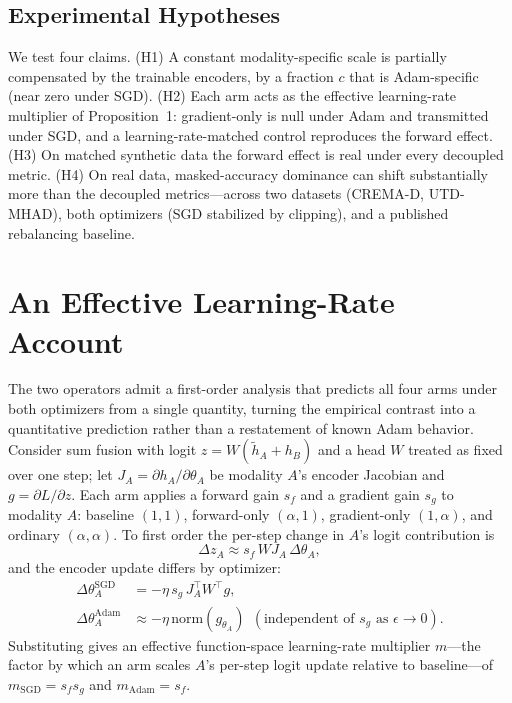 \documentclass[conference]{IEEEtran}
\begin{document}
\subsection{Experimental Hypotheses}
We test four claims. (H1) A constant modality-specific scale is partially compensated by the trainable encoders, by a fraction $c$ that is Adam-specific (near zero under SGD). (H2) Each arm acts as the effective learning-rate multiplier of Proposition~1: gradient-only is null under Adam and transmitted under SGD, and a learning-rate-matched control reproduces the forward effect. (H3) On matched synthetic data the forward effect is real under every decoupled metric. (H4) On real data, masked-accuracy dominance can shift substantially more than the decoupled metrics---across two datasets (CREMA-D, UTD-MHAD), both optimizers (SGD stabilized by clipping), and a published rebalancing baseline.

\section{An Effective Learning-Rate Account}
\label{sec:theory}
The two operators admit a first-order analysis that predicts all four arms under both optimizers from a single quantity, turning the empirical contrast into a quantitative prediction rather than a restatement of known Adam behavior. Consider sum fusion with logit $z=W(\tilde h_A+h_B)$ and a head $W$ treated as fixed over one step; let $J_A=\partial h_A/\partial\theta_A$ be modality $A$'s encoder Jacobian and $g=\partial L/\partial z$. Each arm applies a forward gain $s_f$ and a gradient gain $s_g$ to modality $A$: baseline $(1,1)$, forward-only $(\alpha,1)$, gradient-only $(1,\alpha)$, and ordinary $(\alpha,\alpha)$. To first order the per-step change in $A$'s logit contribution is
\begin{equation}
\Delta z_A \approx s_f\,W J_A\,\Delta\theta_A,
\end{equation}
and the encoder update differs by optimizer:
\begin{align}
\Delta\theta_A^{\mathrm{SGD}} &= -\eta\,s_g\,J_A^{\top}W^{\top}g,\\
\Delta\theta_A^{\mathrm{Adam}} &\approx -\eta\,\mathrm{norm}(g_{\theta_A})\ \ (\text{independent of }s_g\text{ as }\epsilon\!\to\!0).
\end{align}
Substituting gives an effective function-space learning-rate multiplier $m$---the factor by which an arm scales $A$'s per-step logit update relative to baseline---of $m_{\mathrm{SGD}}=s_f s_g$ and $m_{\mathrm{Adam}}=s_f$.
\end{document}
